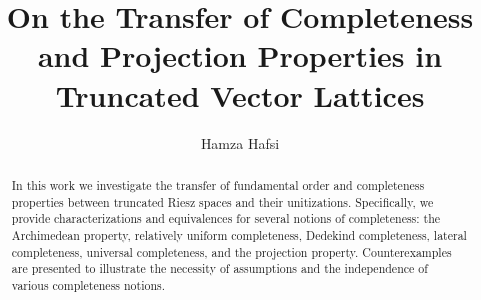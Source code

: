 \documentclass{birkau}
\numberwithin{equation}{section}
\theoremstyle{plain}
\theoremstyle{definition}
\begin{document}

\title[Transfer Properties in Truncated Vector Lattices]{On the Transfer of Completeness and Projection Properties in Truncated Vector Lattices}



\address{Preparatory Institute for Scientific and Technical Studies\\
Carthage University\\2075 Tunis\\Tunisia}

\author[H. Hafsi]{Hamza Hafsi}
\address{Preparatory Institute for Engineering Studies of Tunis\\ University of Tunis: 2 \\1089 Tunis\\Tunisia}




\begin{abstract}
In this work we investigate the transfer of fundamental order and completeness properties
between truncated Riesz spaces and their unitizations. Specifically, we
provide characterizations and equivalences for several notions of
completeness: the Archimedean property, relatively uniform completeness,
Dedekind completeness, lateral completeness, universal completeness, and the
projection property. Counterexamples are presented to illustrate the necessity
of assumptions and the independence of various completeness notions.
\end{abstract}
\end{document}
